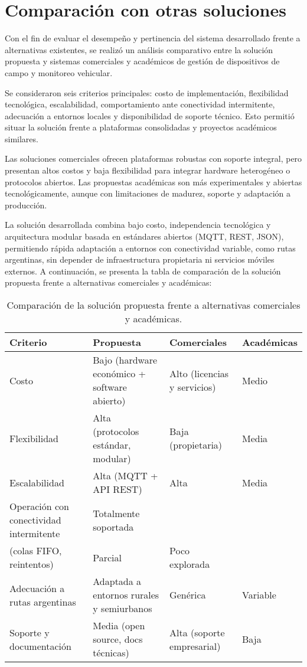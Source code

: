 \section{Comparación con otras soluciones}
\label{sec:comparacion} Con el fin de evaluar el desempeño y pertinencia del sistema desarrollado frente a alternativas existentes, se realizó un análisis comparativo entre la solución propuesta y sistemas comerciales y académicos de gestión de dispositivos de campo y monitoreo vehicular.

Se consideraron seis criterios principales: costo de implementación, flexibilidad tecnológica, escalabilidad, comportamiento ante conectividad intermitente, adecuación a entornos locales y disponibilidad de soporte técnico. Esto permitió situar la solución frente a plataformas consolidadas y proyectos académicos similares.

Las soluciones comerciales ofrecen plataformas robustas con soporte integral, pero presentan altos costos y baja flexibilidad para integrar hardware heterogéneo o protocolos abiertos. Las propuestas académicas son más experimentales y abiertas tecnológicamente, aunque con limitaciones de madurez, soporte y adaptación a producción.

La solución desarrollada combina bajo costo, independencia tecnológica y arquitectura modular basada en estándares abiertos (MQTT, REST, JSON), permitiendo rápida adaptación a entornos con conectividad variable, como rutas argentinas, sin depender de infraestructura propietaria ni servicios móviles externos.
A continuación, se presenta la tabla de comparación de la solución propuesta frente a alternativas comerciales y académicas: 

\begin{table}[H]
    \centering
    \small
    \caption[Comparación de la solución propuesta]{Comparación de la solución propuesta frente a alternativas comerciales y académicas.}
    \begin{tabular}{l p{2.3cm} p{2cm} p{1.2cm}}    
        \toprule
        \textbf{Criterio} & \textbf{Propuesta} & \textbf{Comerciales} & \textbf{Académicas} \\
        \midrule
        Costo & Bajo (hardware económico + software abierto) & Alto (licencias y servicios) & Medio \\
        Flexibilidad & Alta (protocolos estándar, modular) & Baja (propietaria) & Media \\
        Escalabilidad & Alta (MQTT + API REST) & Alta & Media \\
        Operación con conectividad intermitente & Totalmente soportada\\ (colas FIFO, reintentos) & Parcial & Poco explorada \\
        Adecuación a rutas argentinas & Adaptada a entornos rurales y semiurbanos & Genérica & Variable \\
        Soporte y documentación & Media (open source, docs técnicas) & Alta (soporte empresarial) & Baja \\
        \bottomrule
    \end{tabular}
    \label{tab:comparacion}
\end{table}

